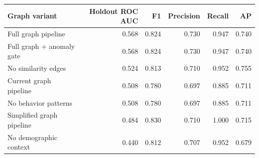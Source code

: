 \begin{tabular}{lrrrrr}
\toprule
Graph variant & Holdout ROC AUC & F1 & Precision & Recall & AP \\
\midrule
Full graph pipeline & 0.568 & 0.824 & 0.730 & 0.947 & 0.740 \\
Full graph + anomaly gate & 0.568 & 0.824 & 0.730 & 0.947 & 0.740 \\
No similarity edges & 0.524 & 0.813 & 0.710 & 0.952 & 0.755 \\
Current graph pipeline & 0.508 & 0.780 & 0.697 & 0.885 & 0.711 \\
No behavior patterns & 0.508 & 0.780 & 0.697 & 0.885 & 0.711 \\
Simplified graph pipeline & 0.484 & 0.830 & 0.710 & 1.000 & 0.715 \\
No demographic context & 0.440 & 0.812 & 0.707 & 0.952 & 0.679 \\
\bottomrule
\end{tabular}
